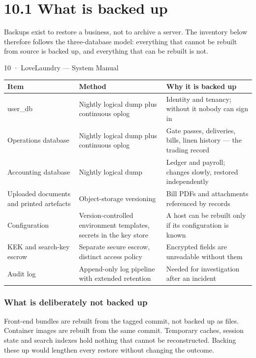 \documentclass[11pt,a4paper,oneside]{book}
\begin{document}
\section{10.1 What is backed up}
Backups exist to restore a business, not to archive a server. The inventory below therefore follows the three-database model: everything that cannot be rebuilt from source is backed up, and everything that can be rebuilt is not.

10 · LoveLaundry — System Manual

\begin{center}\small
\begin{tabularx}{\linewidth}{|X|X|X|}
\hline
\rowcolor{lightgrey}
\textbf{Item} & \textbf{Method} & \textbf{Why it is backed up} \\ \hline
user\_db & Nightly logical dump plus continuous oplog & Identity and tenancy; without it nobody can sign in \\ \hline
Operations database & Nightly logical dump plus continuous oplog & Gate passes, deliveries, bills, linen history — the trading record \\ \hline
Accounting database & Nightly logical dump & Ledger and payroll; changes slowly, restored independently \\ \hline
Uploaded documents and printed artefacts & Object-storage versioning & Bill PDFs and attachments referenced by records \\ \hline
Configuration & Version-controlled environment templates, secrets in the key store & A host can be rebuilt only if its configuration is known \\ \hline
KEK and search-key escrow & Separate secure escrow, distinct access policy & Encrypted fields are unreadable without them \\ \hline
Audit log & Append-only log pipeline with extended retention & Needed for investigation after an incident \\ \hline
\end{tabularx}
\end{center}
\subsubsection*{What is deliberately not backed up}
Front-end bundles are rebuilt from the tagged commit, not backed up as files. Container images are rebuilt from the same commit. Temporary caches, session state and search indexes hold nothing that cannot be reconstructed. Backing these up would lengthen every restore without changing the outcome.
\end{document}
